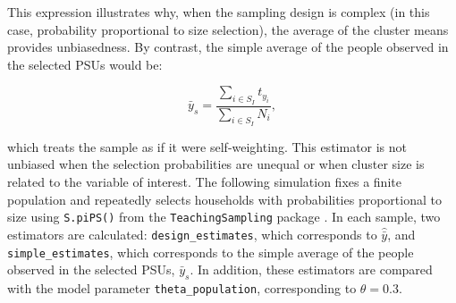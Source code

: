 \documentclass[
  english,
  12pt,
]{book}
\begin{document}
This expression illustrates why, when the sampling design is complex (in this case, probability proportional to size selection), the average of the cluster means provides unbiasedness. By contrast, the simple average of the people observed in the selected PSUs would be:

\[
\bar{y}_s =
\frac{\sum_{i \in S_I}t_{y_i}}
     {\sum_{i \in S_I}N_i},
\]

which treats the sample as if it were self-weighting. This estimator is not unbiased when the selection probabilities are unequal or when cluster size is related to the variable of interest. The following simulation fixes a finite population and repeatedly selects households with probabilities proportional to size using \texttt{S.piPS()} from the \texttt{TeachingSampling} package \citep{GutierrezT2020}. In each sample, two estimators are calculated: \texttt{design\_estimates}, which corresponds to \(\hat{\bar{y}}\), and \texttt{simple\_estimates}, which corresponds to the simple average of the people observed in the selected PSUs, \(\bar{y}_s\). In addition, these estimators are compared with the model parameter \texttt{theta\_population}, corresponding to \(\theta = 0.3\).
\end{document}
